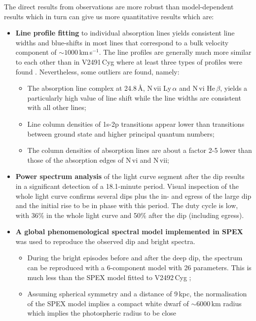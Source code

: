 \documentclass{aa}
\begin{document}
\noindent
The direct results from observations are more robust than model-dependent results which
in turn can give us more quantitative results which are:
\begin{itemize}
  \item {\bf Line profile fitting} to individual absorption lines yields consistent
 line widths and blue-shifts in most lines that correspond to a bulk velocity component of
$\sim 1000$\,km\,s$^{-1}$.
    The line profiles are generally much more similar to each other than in V2491\,Cyg
    where at least three types of profiles were found \citep{nessv2491}.
    Nevertheless, some outliers are found, namely:
  \begin{itemize}
    \item The absorption line complex at 24.8\,\AA, N\,{\sc vii} Ly\,$\alpha$ and
    N\,{\sc vi} He\,$\beta$, yields a particularly high value of line shift while
    the line widths are consistent with all other lines;
    \item Line column densities of 1s-2p transitions appear lower than transitions
     between ground state and higher principal quantum numbers;
    \item The column densities of absorption lines are about a factor 2-5 lower than
    those of the absorption edges of N\,{\sc vi} and N\,{\sc vii};
  \end{itemize}
  \item {\bf Power spectrum analysis} of the light curve segment after the dip results
  in a significant detection of a
 18.1-minute period. Visual inspection of the whole light curve confirms several
 dips plus the in- and egress of the large dip and the initial rise to be in phase
 with this period. The duty cycle is low, with 36\% in the whole light curve and 50\%
 after the dip (including egress).
  \item {\bf A global phenomenological spectral model implemented in SPEX} was used to reproduce the
    observed dip and bright spectra.
  \begin{itemize}
    \item During the bright episodes before and after the deep dip, the spectrum can be
      reproduced with a 6-component model with 26 parameters. This is much less than the
      SPEX model fitted to V2492\,Cyg \citep{pinto12};
    \item Assuming spherical symmetry and a distance of 9\,kpc, the
    normalisation of the SPEX model implies a compact white dwarf of
    $\sim 6000$\,km radius which implies the photospheric radius to be close

\end{itemize}
\end{itemize}
\end{document}
